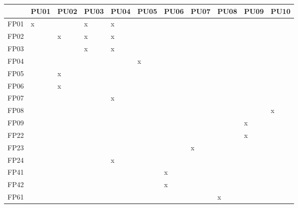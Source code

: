 \begin{table}
    \centering
    \begin{tabular}{l|l|l|l|l|l|l|l|l|l|l}
         & PU01 & PU02 & PU03 & PU04 & PU05 & PU06 & PU07 & PU08 & PU09 & PU10  \\ 
    \hline
    FP01 & x    &      & x    & x    &      &      &      &      &      &       \\ 
    \hline
    FP02 &      & x    & x    & x    &      &      &      &      &      &       \\ 
    \hline
    FP03 &      &      & x    & x    &      &      &      &      &      &       \\ 
    \hline
    FP04 &      &      &      &      & x    &      &      &      &      &       \\ 
    \hline
    FP05 &      & x    &      &      &      &      &      &      &      &       \\ 
    \hline
    FP06 &      & x    &      &      &      &      &      &      &      &       \\ 
    \hline
    FP07 &      &      &      & x    &      &      &      &      &      &       \\ 
    \hline
    FP08 &      &      &      &      &      &      &      &      &      & x     \\ 
    \hline
    FP09 &      &      &      &      &      &      &      &      & x    &       \\ 
    \hline
    FP22 &      &      &      &      &      &      &      &      & x    &       \\ 
    \hline
    FP23 &      &      &      &      &      &      & x    &      &      &       \\ 
    \hline
    FP24 &      &      &      & x    &      &      &      &      &      &       \\ 
    \hline
    FP41 &      &      &      &      &      & x    &      &      &      &       \\ 
    \hline
    FP42 &      &      &      &      &      & x    &      &      &      &       \\ 
    \hline
    FP61 &      &      &      &      &      &      &      & x    &      &      
    \end{tabular}
    \end{table}